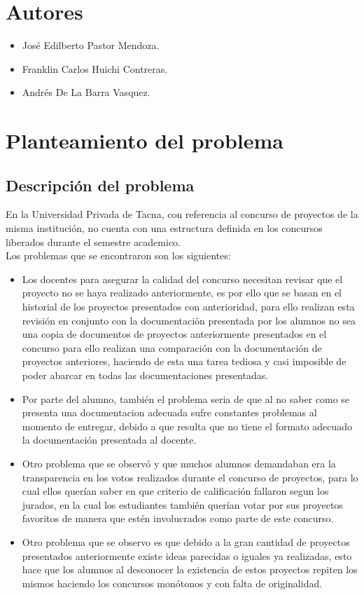 \documentclass[%
 reprint,
 amsmath,amssymb,
 aps,
]{revtex4-1}
\begin{document}
\section{Autores}
\begin{itemize}
\item José Edilberto Pastor Mendoza.
\item Franklin Carlos  Huichi Contreras.
\item Andrés De La Barra Vasquez.
\end{itemize}

\section{Planteamiento del problema}
\subsection{Descripción del problema}
En la Universidad Privada de Tacna, con referencia al concurso de proyectos de la misma institución, no cuenta con una estructura definida en los concursos liberados durante el semestre academico. \\
Los problemas que se encontraron son los siguientes:
\begin{itemize}
\item Los docentes para asegurar la calidad del concurso necesitan revisar que el proyecto no se haya realizado anteriormente, es por ello que se basan en el historial de los proyectos presentados con anterioridad, para ello realizan esta revisión en conjunto con la documentación presentada por los alumnos no sea una copia de documentos de proyectos anteriormente presentados en el concurso para ello realizan una comparación con la documentación de proyectos anteriores, haciendo de esta una tarea tediosa y casi imposible de poder abarcar en todas las documentaciones presentadas.
\item  Por parte del alumno, también el problema seria de que al no saber como se presenta  una documentacion adecuada sufre constantes problemas al momento de entregar, debido a que resulta que no tiene el formato adecuado la documentación presentada al docente. 
\item Otro problema que se observó y que muchos alumnos demandaban era la transparencia en los votos realizados durante el concurso de proyectos, para lo cual ellos querían saber en que criterio de calificación fallaron segun los jurados, en la cual los estudiantes también querían votar por sus proyectos favoritos de manera que estén involucrados como parte de este concurso.
\item Otro problema que se observo es que debido a la gran cantidad de proyectos presentados anteriormente existe ideas parecidas o iguales ya realizadas, esto hace que los alumnos al desconocer la existencia de estos proyectos repiten los mismos haciendo los concursos monótonos y con falta de originalidad.
\end{itemize}
\end{document}
